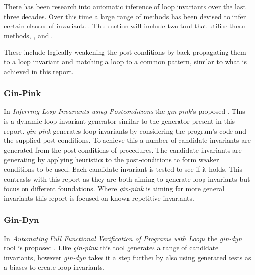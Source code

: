 There has been research into automatic inference of loop invariants over
the last three decades.
Over this time a large range of methods has been devised to infer certain
classes of invariants \cite{infer-dynamic}\cite{infer-postconditions}\cite{struct-induction}.
This section will include two tool that utilise these methods,
 \cite{infer-postconditions}, and  \cite{infer-dynamic}.

These include logically weakening the post-conditions by back-propagating them
to a loop invariant \cite{infer-postconditions}\cite{infer-dynamic} and
matching a loop to a common pattern\cite{pattern-loop-inv}, similar to what is achieved in this
report.


\subsubsection{Gin-Pink}

In \textit{Inferring Loop Invariants using Postconditions} 
the \textit{gin-pink}'s proposed \cite{infer-postconditions}.
This is a dynamic loop invariant generator similar to the generator
present in this report.
\textit{gin-pink} generates loop invariants by considering the program's code
and the supplied post-conditions.
To achieve this a number of candidate invariants are generated from the 
post-conditions of procedures.
The candidate invariants are generating by applying heuristics to the
post-conditions to form weaker conditions to be used.
Each candidate invariant is tested to see if it holds.
This contrasts with this report as they are both aiming to generate loop
invariants but focus on different foundations.
Where \textit{gin-pink} is aiming for more general invariants 
this report is focused on known repetitive invariants.

\subsubsection{Gin-Dyn}

In \textit{Automating Full Functional Verification of Programs with Loops} the
\textit{gin-dyn} tool is proposed \cite{infer-dynamic}.
Like \textit{gin-pink} this tool generates a range of candidate invariants,
however \textit{gin-dyn} takes it a step further by also using generated tests
as a biases to create loop invariants.



